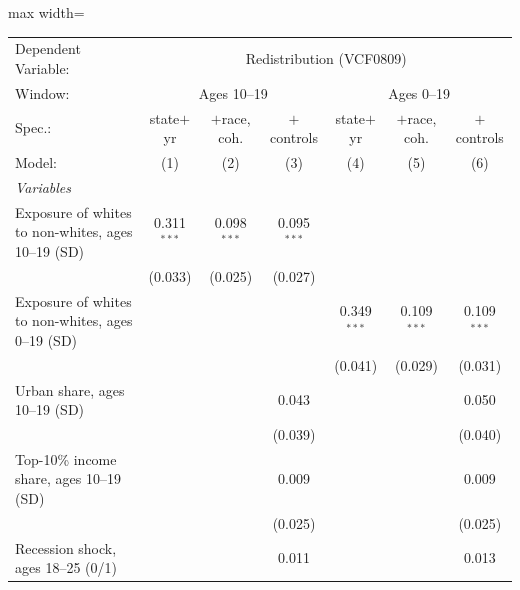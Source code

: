       \begin{adjustbox}{max width=\linewidth}
   \begin{tabular}{lcccccc}
      \tabularnewline \midrule \midrule
      Dependent Variable: & \multicolumn{6}{c}{Redistribution (VCF0809)}\\
      Window: & \multicolumn{3}{c}{Ages 10--19} & \multicolumn{3}{c}{Ages 0--19} \\ 
      Spec.:                                             & state$+$yr    & $+$race, coh. & $+$controls   & state$+$yr    & $+$race, coh. & $+$controls \\   
      Model:                                             & (1)           & (2)           & (3)           & (4)           & (5)           & (6)\\  
      \midrule
      \emph{Variables}\\
      Exposure of whites to non-whites, ages 10--19 (SD) & 0.311$^{***}$ & 0.098$^{***}$ & 0.095$^{***}$ &               &               &   \\   
                                                         & (0.033)       & (0.025)       & (0.027)       &               &               &   \\   
      Exposure of whites to non-whites, ages 0--19 (SD)  &               &               &               & 0.349$^{***}$ & 0.109$^{***}$ & 0.109$^{***}$\\   
                                                         &               &               &               & (0.041)       & (0.029)       & (0.031)\\   
      Urban share, ages 10--19 (SD)                      &               &               & 0.043         &               &               & 0.050\\   
                                                         &               &               & (0.039)       &               &               & (0.040)\\   
      Top-10\% income share, ages 10--19 (SD)            &               &               & 0.009         &               &               & 0.009\\   
                                                         &               &               & (0.025)       &               &               & (0.025)\\   
      Recession shock, ages 18--25 (0/1)                 &               &               & 0.011         &               &               & 0.013\\   

\end{tabular}
\end{adjustbox}

